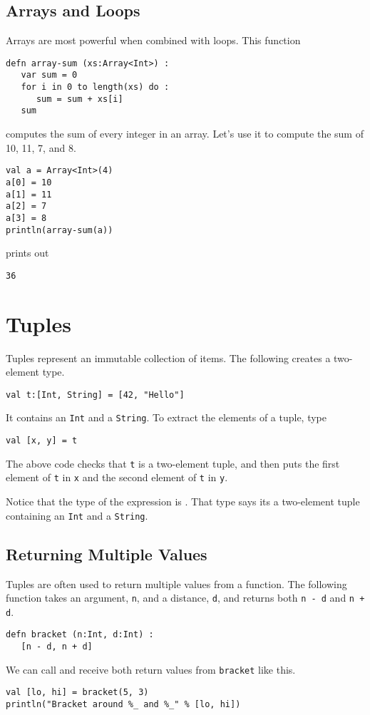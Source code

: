 \documentclass[10pt,oneside]{book}
\begin{document}
\subsection*{Arrays and Loops}
Arrays are most powerful when combined with loops. This function
\begin{lstlisting}
defn array-sum (xs:Array<Int>) :
   var sum = 0
   for i in 0 to length(xs) do :
      sum = sum + xs[i]
   sum   
\end{lstlisting}
computes the sum of every integer in an array. Let's use it to compute the sum of 10, 11, 7, and 8. 
\begin{lstlisting}
val a = Array<Int>(4)
a[0] = 10
a[1] = 11
a[2] = 7
a[3] = 8
println(array-sum(a))
\end{lstlisting}
prints out
\begin{lstlisting}
36
\end{lstlisting}

\section{Tuples}
Tuples represent an immutable collection of items. The following creates a two-element type.
\begin{lstlisting}
val t:[Int, String] = [42, "Hello"]
\end{lstlisting}
It contains an \texttt{\frenchspacing Int} and a \texttt{\frenchspacing String}. To extract the elements of a tuple, type
\begin{lstlisting}
val [x, y] = t
\end{lstlisting}
The above code checks that \texttt{\frenchspacing t} is a two-element tuple, and then puts the first element of \texttt{\frenchspacing t} in \texttt{\frenchspacing x} and the second element of \texttt{\frenchspacing t} in \texttt{\frenchspacing y}.

Notice that the type of the expression \texttt{\frenchspacing [42, "Hello"]} is \texttt{}. That type says its a two-element tuple containing an \texttt{\frenchspacing Int} and a \texttt{\frenchspacing String}. 

\subsection*{Returning Multiple Values}
Tuples are often used to return multiple values from a function. The following function takes an argument, \texttt{\frenchspacing n}, and a distance, \texttt{\frenchspacing d}, and returns both \texttt{\frenchspacing n - d} and \texttt{\frenchspacing n + d}.
\begin{lstlisting}
defn bracket (n:Int, d:Int) :
   [n - d, n + d]
\end{lstlisting}
We can call and receive both return values from \texttt{\frenchspacing bracket} like this.
\begin{lstlisting}
val [lo, hi] = bracket(5, 3)
println("Bracket around %_ and %_" % [lo, hi])
\end{lstlisting}
\end{document}
